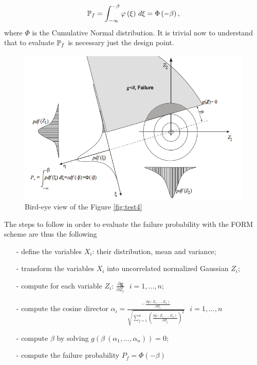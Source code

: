 \begin{equation}
\P_{f}=\int_{-\infty}^{-\beta}\varphi\rbkt{\xi}\,d\xi=\Phi\rbkt{-\beta},
\end{equation}
where $\Phi$ is the Cumulative Normal distribution. It is trivial now to understand that to evaluate $\P_{f}$ is necessary just the design point.
\begin{figure}[t]
\centering
  \includegraphics[scale=0.5]{./SurfWaves_figs/2_dimensional_case.png}
\caption{Bird-eye view of the Figure \ref{fig:test4}}
  \label{fig:test5}
\end{figure}
The steps to follow in order to evaluate the failure probability with the FORM scheme are thus the following
\begin{itemize}
\item[-]define the variables $X_{i}$: their distribution, mean and variance;
\item[-]transform the variables $X_{i}$ into uncorrelated normalized Gaussian $Z_{i}$;
\item[-]compute for each variable $Z_{i}$: $\frac{\partial \mathbf{g}}{\partial Z_{i}} ~ ~ ~  i = 1,...,n$;
\item[-]compute the cosine director 
 $
 \alpha_i = \frac 
	{- \frac {\partial g(Z_1,...,Z_n)} {\partial Z_i}}
	{
		\sqrt{
		\sum_{j=1}^n 
			(\frac {\partial g(Z_1,...,Z_n)} 
							{\partial Z_j})^2
		}
	} 
	~ ~ ~ i=1,...,n
 $
\item[-]compute $\beta$ by solving $g(\beta ~ (\alpha_1, ..., \alpha_n)) = 0;$
\item[-]compute the failure probability $P_f = \Phi (-\beta) $ 
\end{itemize}


